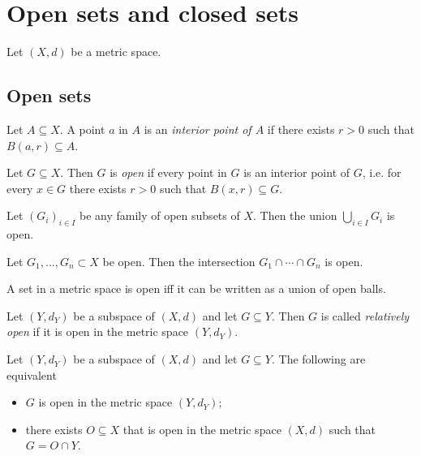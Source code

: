 \documentclass{article}
\begin{document}
\section{Open sets and closed sets}

Let $(X,d)$ be a metric space.

\subsection{Open sets}

\begin{definition}
    Let $A\subseteq X$. A point $a$ in $A$ is
    an \emph{interior point of $A$} if there exists $r>0$ such that $B(a,r)\subseteq A$.
\end{definition}

\begin{definition}
    Let $G\subseteq X$. Then $G$ is \emph{open} if
    every point in $G$ is an interior point of $G$, i.e. for every $x\in G$ there exists
    $r>0$ such that $B(x,r)\subseteq G$.
\end{definition}

\begin{theorem}[Notes 4.6]
    Let $(G_i)_{i\in I}$ be any family of open subsets of $X$. Then the union
    $\bigcup_{i\in I} G_i$ is open.
\end{theorem}

\begin{theorem}[Notes 4.7]
    Let $G_1,...,G_n\subset X$ be open. Then the intersection $G_1\cap\cdots\cap G_n$
    is open.
\end{theorem}

\begin{proposition}[Notes 4.9]
    A set in a metric space is open iff it can be written as a union of open balls.
\end{proposition}

\begin{definition}
    Let $(Y,d_Y)$ be a subspace of $(X,d)$ and let $G\subseteq Y$. Then $G$ is called
    \emph{relatively open} if it is open in the metric space $(Y,d_Y)$.
\end{definition}

\begin{proposition}[Notes 4.10]
    Let $(Y,d_Y)$ be a subspace of $(X,d)$ and let $G\subseteq Y$. The following
    are equivalent
    \begin{itemize}
        \item $G$ is open in the metric space $(Y,d_Y)$;
        \item there exists $O\subseteq X$ that is open in the metric space $(X,d)$ such that $G=O\cap Y$.
    \end{itemize}
\end{proposition}
\end{document}
